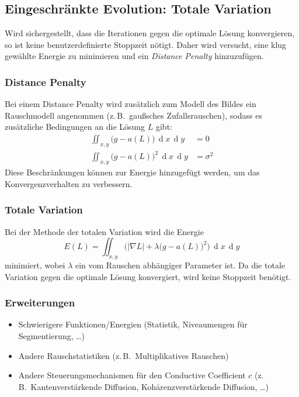 \documentclass[a4paper, 11pt, accentcolor = tud3b]{tudreport}
\DeclareMathOperator{\total}{d}
\newcommand{\dif}[1]{\,\total#1}
\newcommand{\zB}{z.\,B.~}
\begin{document}
			\subsection{Eingeschränkte Evolution: Totale Variation}
				Wird sichergestellt, dass die Iterationen gegen die optimale Lösung konvergieren, so ist keine benutzerdefinierte Stoppzeit nötigt. Daher wird versucht, eine klug gewählte Energie zu minimieren und ein \emph{Distance Penalty} hinzuzufügen.

				\subsubsection{Distance Penalty}
					Bei einem Distance Penalty wird zusätzlich zum Modell des Bildes ein Rauschmodell angenommen (\zB gaußsches Zufallsrauschen), sodass es zusätzliche Bedingungen an die Lösung \(L\) gibt:
					\begin{align*}
						\iint_{x, y} \! \big( g - a(L) \big) \dif{x} \dif{y} &= 0 \\
						\iint_{x, y} \! \big( g - a(L) \big)^2 \dif{x} \dif{y} &= \sigma^2
					\end{align*}
					Diese Beschränkungen können zur Energie hinzugefügt werden, um das Konvergenzverhalten zu verbessern.

				\subsubsection{Totale Variation}
					Bei der Methode der totalen Variation wird die Energie
					\begin{equation*}
						E(L) = \iint_{x, y} \! \Big( \lvert \nabla L \rvert + \lambda\big( g - a(L) \big)^2 \Big) \dif{x} \dif{y}
					\end{equation*}
					minimiert, wobei \(\lambda\) ein vom Rauschen abhängiger Parameter ist. Da die totale Variation gegen die optimale Lösung konvergiert, wird keine Stoppzeit benötigt.

				\subsubsection{Erweiterungen}
					\begin{itemize}
						\item Schwierigere Funktionen/Energien (Statistik, Niveaumengen für Segmentierung, \dots)
						\item Andere Rauschstatistiken (\zB Multiplikatives Rauschen)
						\item Andere Steuerungsmechanismen für den Conductive Coefficient \(c\) (\zB Kantenverstärkende Diffusion, Kohärenzverstärkende Diffusion, \dots)
					\end{itemize}
\end{document}
